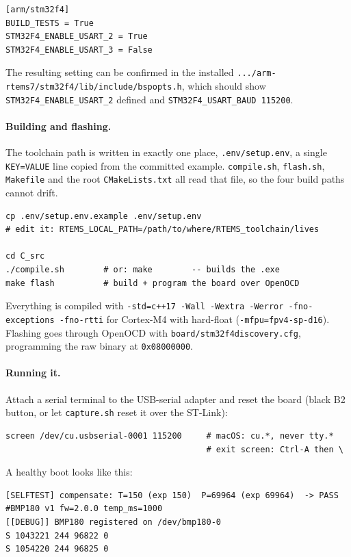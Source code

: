 \documentclass[10pt,a4]{article}
\begin{document}
\begin{verbatim}
[arm/stm32f4]
BUILD_TESTS = True
STM32F4_ENABLE_USART_2 = True
STM32F4_ENABLE_USART_3 = False
\end{verbatim}

The resulting setting can be confirmed in the installed
\texttt{.../arm-rtems7/stm32f4/lib/include/bspopts.h}, which should show
\texttt{STM32F4\_ENABLE\_USART\_2} defined and \texttt{STM32F4\_USART\_BAUD
115200}.

\paragraph{Building and flashing.} The toolchain path is written in exactly one
place, \texttt{.env/setup.env}, a single \texttt{KEY=VALUE} line copied from the
committed example. \texttt{compile.sh}, \texttt{flash.sh}, \texttt{Makefile} and
the root \texttt{CMakeLists.txt} all read that file, so the four build paths
cannot drift.

\begin{verbatim}
cp .env/setup.env.example .env/setup.env
# edit it: RTEMS_LOCAL_PATH=/path/to/where/RTEMS_toolchain/lives

cd C_src
./compile.sh        # or: make        -- builds the .exe
make flash          # build + program the board over OpenOCD
\end{verbatim}

Everything is compiled with \texttt{-std=c++17 -Wall -Wextra -Werror
-fno-exceptions -fno-rtti} for Cortex-M4 with hard-float
(\texttt{-mfpu=fpv4-sp-d16}). Flashing goes through OpenOCD with
\texttt{board/stm32f4discovery.cfg}, programming the raw binary at
\texttt{0x08000000}.

\paragraph{Running it.} Attach a serial terminal to the USB-serial adapter and
reset the board (black B2 button, or let \texttt{capture.sh} reset it over the
ST-Link):

\begin{verbatim}
screen /dev/cu.usbserial-0001 115200     # macOS: cu.*, never tty.*
                                         # exit screen: Ctrl-A then \
\end{verbatim}

A healthy boot looks like this:

\begin{verbatim}
[SELFTEST] compensate: T=150 (exp 150)  P=69964 (exp 69964)  -> PASS
#BMP180 v1 fw=2.0.0 temp_ms=1000
[[DEBUG]] BMP180 registered on /dev/bmp180-0
S 1043221 244 96822 0
S 1054220 244 96825 0
\end{verbatim}
\end{document}
